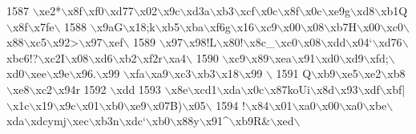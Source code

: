 \begin{DoxyCode}
{{{1587 \textcolor{stringliteral}{\(\backslash\)xe2*\(\backslash\)x8f\(\backslash\)xf0\(\backslash\)xd77\(\backslash\)x02\(\backslash\)x9c\(\backslash\)xd3a\(\backslash\)xb3\(\backslash\)xcf\(\backslash\)x0c\(\backslash\)x8f\(\backslash\)x0c\(\backslash\)xe9g\(\backslash\)xd8\(\backslash\)xb1Q\(\backslash\)x8f\(\backslash\)x7fe\(\backslash\)}
1588 \textcolor{stringliteral}{\(\backslash\)x9aG\(\backslash\)x18;k\(\backslash\)xb5\(\backslash\)xba\(\backslash\)xf6g\(\backslash\)x16\(\backslash\)xc9\(\backslash\)x00\(\backslash\)x08\(\backslash\)xb7H\(\backslash\)x00\(\backslash\)xc0\(\backslash\)x88\(\backslash\)xc5\(\backslash\)x92>\(\backslash\)x97\(\backslash\)xef\(\backslash\)}
1589 \textcolor{stringliteral}{\(\backslash\)x97\(\backslash\)x98!L\(\backslash\)x80!\(\backslash\)x8c\_\(\backslash\)xc0\(\backslash\)x08\(\backslash\)xdd\(\backslash\)x04`\(\backslash\)xd76\(\backslash\)xbc6!?\(\backslash\)xc2I\(\backslash\)x08\(\backslash\)xd6\(\backslash\)xb2\(\backslash\)xf2r\(\backslash\)xa4\(\backslash\)}
1590 \textcolor{stringliteral}{\(\backslash\)xc9\(\backslash\)x89\(\backslash\)xea\(\backslash\)x91\(\backslash\)xd0\(\backslash\)xd9\(\backslash\)xfd;\(\backslash\)xd0\(\backslash\)xee\(\backslash\)x9e\(\backslash\)x96.\(\backslash\)x99 \(\backslash\)xfa\(\backslash\)xa9\(\backslash\)xc3\(\backslash\)xb3\(\backslash\)x18\(\backslash\)x99 \(\backslash\)}
1591 \textcolor{stringliteral}{Q\(\backslash\)xb9\(\backslash\)xe5\(\backslash\)xe2\(\backslash\)xb8\(\backslash\)xe8\(\backslash\)xc2\(\backslash\)x94r%
1592 \textcolor{stringliteral}{\(\backslash\)xdd%
1593 \textcolor{stringliteral}{\(\backslash\)x8e\(\backslash\)xcd1\(\backslash\)xda\(\backslash\)x0c\(\backslash\)x87koUi\(\backslash\)x8d\(\backslash\)x93\(\backslash\)xdf\(\backslash\)xbf|\(\backslash\)x1c\(\backslash\)x19\(\backslash\)x9c\(\backslash\)x01\(\backslash\)xb0\(\backslash\)xe9\(\backslash\)x07B)\(\backslash\)x05\(\backslash\)}
1594 \textcolor{stringliteral}{!\(\backslash\)x84\(\backslash\)x01\(\backslash\)xa0\(\backslash\)x00\(\backslash\)xa0\(\backslash\)xbe\(\backslash\)xda\(\backslash\)xdcymj\(\backslash\)xec\(\backslash\)xb3n\(\backslash\)xdc`\(\backslash\)xb0\(\backslash\)x88y\(\backslash\)x91^\(\backslash\)xb9R&\(\backslash\)xed\(\backslash\)}
}}}}}
\end{DoxyCode}
